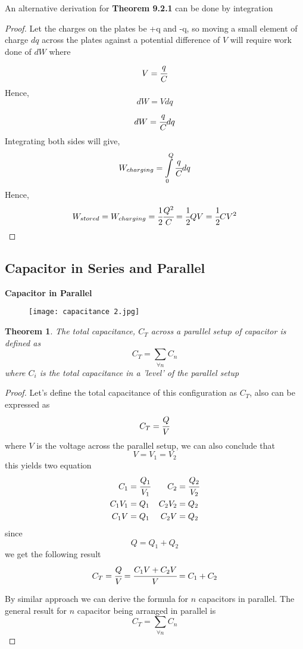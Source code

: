 \documentclass{article}
\newtheorem{theorem}{Theorem}[subsection]
\begin{document}
\begin{flushleft}
An alternative derivation for \textbf{Theorem 9.2.1} can be done by integration
\end{flushleft}
\begin{proof}
Let the charges on the plates be +q and -q, so moving a small element of charge $dq$ across the plates against a potential difference of $V$ will require work done of $dW$ where 
$$V=\cfrac{q}{C}$$
Hence,
$$dW=Vdq$$
$$dW=\cfrac{q}{C}dq$$
Integrating both sides will give,
$$W_{charging}=\int \limits_{0}^{Q}\cfrac{q}{C}dq$$
Hence,
$$W_{stored}=W_{charging}=\cfrac{1}{2}\cfrac{Q^2}{C}=\cfrac{1}{2}QV=\cfrac{1}{2}CV^2$$
\end{proof}



 \subsection{Capacitor in Series and Parallel}


\textbf{Capacitor in Parallel}
\begin{figure}[H]
    \centering
    \texttt{[image: capacitance 2.jpg]}
\end{figure}

\begin{theorem}
The total capacitance, $C_T$ across a parallel setup of capacitor is defined as 
$$C_T=\sum\limits_{\forall n}C_n$$
where $C_i$ is the total capacitance in a 'level' of the parallel setup
\end{theorem}

\begin{proof}
Let's define the total capacitance of this configuration as $C_T$, also can be expressed as
$$C_T=\cfrac{Q}{V}$$
where $V$ is the voltage across the parallel setup, we can also conclude that 
$$V=V_1=V_2$$
this yields two equation 
\begin{align*}
    C_1&=\cfrac{Q_1}{V_1} & C_2&=\cfrac{Q_2}{V_2} \\
      C_1V_1&=Q_1 & C_2V_2&=Q_2 \\
       C_1V&=Q_1 & C_2V&=Q_2
      \end{align*}
since 
$$Q=Q_1+Q_2$$
we get the following result 
$$C_T=\cfrac{Q}{V}=\cfrac{C_1V+C_2V}{V}=C_1+C_2$$

By similar approach we can derive the formula for $n$ capacitors in parallel. The general result for $n$ capacitor being arranged in parallel is 
$$C_T=\sum\limits_{\forall n}C_n$$
\end{proof}
\end{document}
